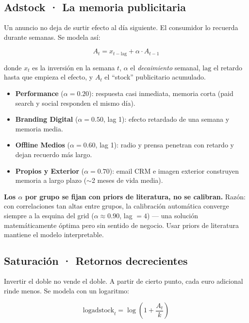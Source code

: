 \subsection{Adstock · La memoria publicitaria}

Un anuncio no deja de surtir efecto al día siguiente. El consumidor lo recuerda durante semanas. Se modela así:

\[
A_t = x_{t-\text{lag}} + \alpha \cdot A_{t-1}
\]

donde $x_t$ es la inversión en la semana $t$, $\alpha$ el \textit{decaimiento} semanal, $\text{lag}$ el retardo hasta que empieza el efecto, y $A_t$ el ``stock'' publicitario acumulado.

\begin{itemize}[leftmargin=*, itemsep=1pt]
    \item \textbf{Performance} ($\alpha=0.20$): respuesta casi inmediata, memoria corta (paid search y social responden el mismo día).
    \item \textbf{Branding Digital} ($\alpha=0.50$, lag 1): efecto retardado de una semana y memoria media.
    \item \textbf{Offline Medios} ($\alpha=0.60$, lag 1): radio y prensa penetran con retardo y dejan recuerdo más largo.
    \item \textbf{Propios y Exterior} ($\alpha=0.70$): email CRM e imagen exterior construyen memoria a largo plazo ($\sim$2 meses de vida media).
\end{itemize}

\begin{decisionbox}
\textbf{Los $\alpha$ por grupo se fijan con priors de literatura, no se calibran.} Razón: con correlaciones tan altas entre grupos, la calibración automática converge siempre a la esquina del grid ($\alpha \approx 0.90$, lag $=4$) — una solución matemáticamente óptima pero sin sentido de negocio. Usar priors de literatura mantiene el modelo interpretable.
\end{decisionbox}

\subsection{Saturación · Retornos decrecientes}

Invertir el doble no vende el doble. A partir de cierto punto, cada euro adicional rinde menos. Se modela con un logaritmo:

\[
\mathrm{logadstock}_t = \log\left(1 + \frac{A_t}{k}\right)
\]

